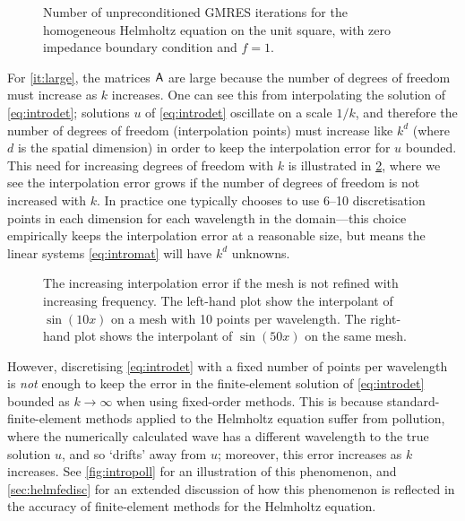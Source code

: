         \begin{figure}[h]
      \centering
      
      \caption[Number of unpreconditioned GMRES iterations for the homogeneous Helmholtz equation]{Number of unpreconditioned GMRES iterations for the homogeneous Helmholtz equation on the unit square, with zero impedance boundary condition and $f=1$.\label{fig:GMRES}}
      \end{figure}
    
    For \cref{it:large}, the matrices $\mathsf{A}$ are large because the number of degrees of freedom must increase as $k$ increases. One can see this from interpolating the solution of \eqref{eq:introdet}; solutions $u$ of \eqref{eq:introdet} oscillate on a scale $1/k$, and therefore the number of degrees of freedom (interpolation points) must increase like $k^d$ (where $d$ is the spatial dimension) in order to keep the interpolation error for $u$ bounded. This need for increasing degrees of freedom with $k$ is illustrated in \cref{fig:introinterp}, where we see the interpolation error grows if the number of degrees of freedom is not increased with $k$. In practice one typically chooses to use 6--10 discretisation points in each dimension for each wavelength in the domain---this choice  empirically keeps the interpolation error at a reasonable size, but means the linear systems \eqref{eq:intromat} will have $k^d$ unknowns.

\begin{figure}[h]
    \centering
  \begin{subfigure}{0.45\textwidth}

  \end{subfigure}
    \begin{subfigure}{0.45\textwidth}

    \end{subfigure}
\caption[The increasing interpolation error if the mesh is not refined with increasing frequency.]{\label{fig:introinterp} The increasing interpolation error if the mesh is not refined with increasing frequency. The left-hand plot show the interpolant of $\sin(10x)$ on a mesh with 10 points per wavelength. The right-hand plot shows the interpolant of $\sin(50x)$ on the same mesh.}
\end{figure}

However, discretising \eqref{eq:introdet} with a fixed number of points per wavelength is \emph{not} enough to keep the error in the finite-element solution of \eqref{eq:introdet} bounded as $k\rightarrow \infty$ when using fixed-order methods. This is because standard-finite-element methods applied to the Helmholtz equation suffer from pollution, where the numerically calculated wave has a different wavelength to the true solution $u$, and so `drifts' away from $u$; moreover, this error increases as $k$ increases. See \cref{fig:intropoll} for an illustration of this phenomenon, and \cref{sec:helmfedisc} for an extended discussion of how this phenomenon is reflected in the accuracy of finite-element methods for the Helmholtz equation.

